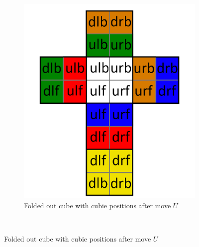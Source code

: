 \documentclass[12pt,a4paper]{article}
\theoremstyle{custom}
\begin{document}
\begin{figure}[h]
\begin{minipage}[b][][b]{0.43\textwidth}
\begin{figure}[H]
\centering
\includegraphics[scale=0.15]{foldedout_spin.png}
\caption{Folded out cube with cubie positions after move $U$}
\label{Figure_CubiePositionNameAfterU-2}
\end{figure}

\end{minipage}\begin{minipage}[b][][b]{0.04\textwidth}$\ $ \end{minipage}
\end{figure}
\end{document}
